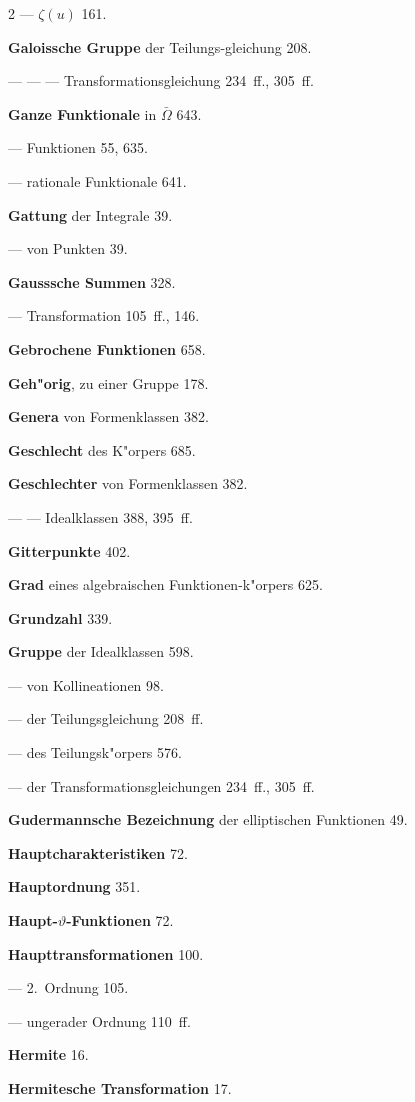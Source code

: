 \documentclass[12pt,a4paper]{article}
\begin{document}
\begin{multicols}{2}
--- $\zeta(u)$ 161.

\bigskip

\textbf{Galoissche Gruppe} der Teilungs{-}gleichung 208.

--- --- --- Transformationsgleichung 234~ff., 305~ff.

\textbf{Ganze Funktionale} in $\bar{\Omega}$ 643.

--- Funktionen 55, 635.

--- rationale Funktionale 641.

\textbf{Gattung} der Integrale 39.

--- von Punkten 39.

\textbf{Gausssche Summen} 328.

--- Transformation 105~ff., 146.

\textbf{Gebrochene Funktionen} 658.

\textbf{Geh"orig}, zu einer Gruppe 178.

\textbf{Genera} von Formenklassen 382.

\textbf{Geschlecht} des K"orpers 685.

\textbf{Geschlechter} von Formenklassen 382.

--- --- Idealklassen 388, 395~ff.

\textbf{Gitterpunkte} 402.

\textbf{Grad} eines algebraischen Funktionen{-}k"orpers 625.

\textbf{Grundzahl} 339.

\textbf{Gruppe} der Idealklassen 598.

--- von Kollineationen 98.

--- der Teilungsgleichung 208~ff.

--- des Teilungsk"orpers 576.

--- der Transformationsgleichungen 234~ff., 305~ff.

\textbf{Gudermannsche Bezeichnung} der elliptischen Funktionen 49.

\bigskip

\textbf{Hauptcharakteristiken} 72.

\textbf{Hauptordnung} 351.

\textbf{Haupt-$\vartheta$-Funktionen} 72.

\textbf{Haupttransformationen} 100.

--- 2.~Ordnung 105.

--- ungerader Ordnung 110~ff.

\textbf{Hermite} 16.

\textbf{Hermitesche Transformation} 17.


\end{multicols}
\end{document}
